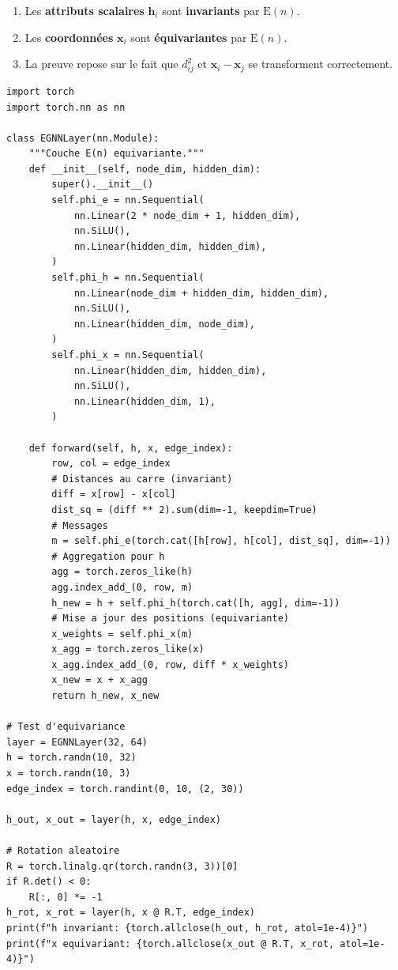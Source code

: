 \begin{proposition}
\begin{enumerate}
    \item Les \textbf{attributs scalaires} $\mathbf{h}_i$ sont
          \textbf{invariants} par $\mathrm{E}(n)$.
    \item Les \textbf{coordonn\'ees} $\mathbf{x}_i$ sont
          \textbf{\'equivariantes} par $\mathrm{E}(n)$.
    \item La preuve repose sur le fait que $d_{ij}^2$ et
          $\mathbf{x}_i - \mathbf{x}_j$ se transforment correctement.
\end{enumerate}
\end{proposition}

\begin{codeblock}[title=\textbf{Impl\'ementation EGNN}]
\begin{verbatim}
import torch
import torch.nn as nn

class EGNNLayer(nn.Module):
    """Couche E(n) equivariante."""
    def __init__(self, node_dim, hidden_dim):
        super().__init__()
        self.phi_e = nn.Sequential(
            nn.Linear(2 * node_dim + 1, hidden_dim),
            nn.SiLU(),
            nn.Linear(hidden_dim, hidden_dim),
        )
        self.phi_h = nn.Sequential(
            nn.Linear(node_dim + hidden_dim, hidden_dim),
            nn.SiLU(),
            nn.Linear(hidden_dim, node_dim),
        )
        self.phi_x = nn.Sequential(
            nn.Linear(hidden_dim, hidden_dim),
            nn.SiLU(),
            nn.Linear(hidden_dim, 1),
        )

    def forward(self, h, x, edge_index):
        row, col = edge_index
        # Distances au carre (invariant)
        diff = x[row] - x[col]
        dist_sq = (diff ** 2).sum(dim=-1, keepdim=True)
        # Messages
        m = self.phi_e(torch.cat([h[row], h[col], dist_sq], dim=-1))
        # Aggregation pour h
        agg = torch.zeros_like(h)
        agg.index_add_(0, row, m)
        h_new = h + self.phi_h(torch.cat([h, agg], dim=-1))
        # Mise a jour des positions (equivariante)
        x_weights = self.phi_x(m)
        x_agg = torch.zeros_like(x)
        x_agg.index_add_(0, row, diff * x_weights)
        x_new = x + x_agg
        return h_new, x_new

# Test d'equivariance
layer = EGNNLayer(32, 64)
h = torch.randn(10, 32)
x = torch.randn(10, 3)
edge_index = torch.randint(0, 10, (2, 30))

h_out, x_out = layer(h, x, edge_index)

# Rotation aleatoire
R = torch.linalg.qr(torch.randn(3, 3))[0]
if R.det() < 0:
    R[:, 0] *= -1
h_rot, x_rot = layer(h, x @ R.T, edge_index)
print(f"h invariant: {torch.allclose(h_out, h_rot, atol=1e-4)}")
print(f"x equivariant: {torch.allclose(x_out @ R.T, x_rot, atol=1e-4)}")
\end{verbatim}
\end{codeblock}

